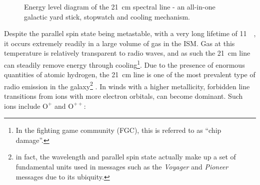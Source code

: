 \begin{figure}[H]
  \caption[The \SI{21}{cm} spectral line]{Energy level diagram of the \SI{21}{cm} spectral line - an all-in-one galactic yard stick, stopwatch and cooling mechanism.}
  \label{fig:quiver-h}
\end{figure}

\noindent
Despite the parallel spin state being metastable, with a very long lifetime of \SI{11}{\mega\year}, it occurs extremely readily in a large volume of gas in the ISM.
Gas at this temperature is relatively transparent to radio waves, and as such the \SI{21}{cm} line can steadily remove energy through cooling\footnote{In the fighting game community (FGC), this is referred to as ``chip damage''.}.
Due to the presence of enormous quantities of atomic hydrogen, the \SI{21}{\centi\metre} line is one of the most prevalent type of radio emission in the galaxy\footnote{in fact, the wavelength and parallel spin state actually make up a set of fundamental units used in messages such as the \textit{Voyager} and \textit{Pioneer} messages due to its ubiquity.}
\parencite[Ch.~8]{drainePhysicsInterstellarIntergalactic2011}.
In winds with a higher metallicity, forbidden line transitions from ions with more electron orbitals, can become dominant.
Such ions include $\text{O}^+$ and $\text{O}^{++}$:

